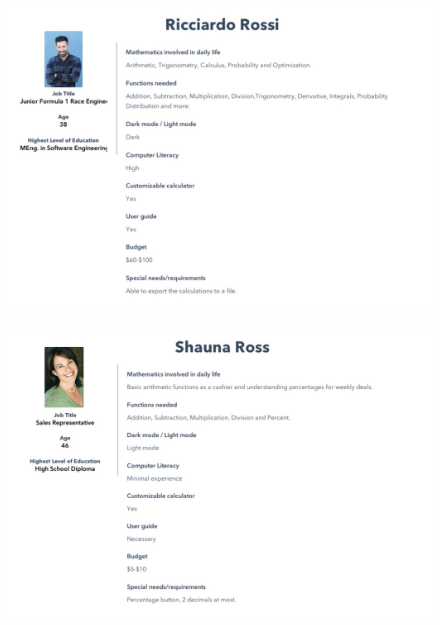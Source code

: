\documentclass[titlepage]{article}
\begin{document}
            \begin{figure}[!htb]
                \centering
                \includegraphics{images/Ricciardo-Rossi.JPG}
            \end{figure}
            \begin{figure}[!htb]
                \centering
                \includegraphics{images/Shauna-Ross.JPG}
            \end{figure}
            \FloatBarrier
        
\end{document}
